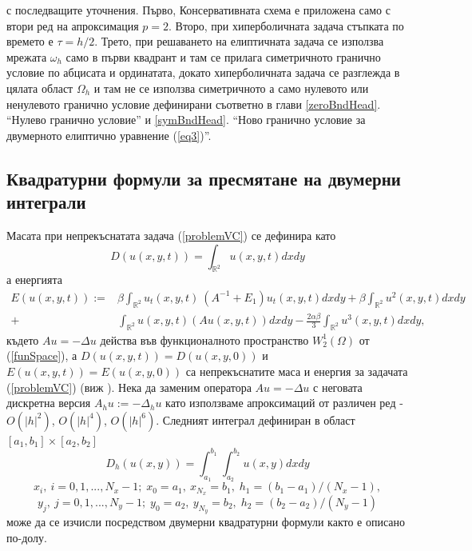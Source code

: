 \documentclass{article}
\newcommand{\rf}[1]{(\ref{#1})}
\newcommand{\RR}{\mathbb{R}}
\theoremstyle{remark}
\begin{document}
с последващите уточнения. Първо, Консервативната схема е приложена само с втори ред на апроксимация  $p=2$. Второ, при хиперболичната задача стъпката по времето е $\tau = h/2$. Трето, при решаването на елиптичната задача се използва мрежата $\omega_h$ само в първи квадрант и там се прилага симетричното гранично условие по абцисата и ординатата, докато хиперболичната задача се разглежда в цялата област $\Omega_h$ и там не се използва симетричното а само нулевото или ненулевото гранично условие дефинирани съответно в глави \ref{zeroBndHead}. ``Нулево гранично условие'' и \ref{symBndHead}. ``Ново гранично условие за двумерното елиптично уравнение \rf{eq3}''.

\subsection{Квадратурни формули за пресмятане на двумерни интеграли}\label{quadratureFormulas}

Масата при непрекъснатата задача \rf{problemVC} се дефинира като
\begin{equation}\label{intM}
D(u(x,y,t))=\int_{\RR^2} u(x,y,t)dx dy
\end{equation}
а енергията 
\begin{align}\label{ex-en}
E(u(x,y,t)):=&\beta \int_{\RR^2} u_t(x,y,t) \: \left(A^{-1}+E_1\right)u_t(x,y,t) dxdy+
\beta \int_{\RR^2} u^2(x,y,t) dxdy \nonumber\\
+& \int_{\RR^2}u(x,y,t) \left(A u(x,y,t)\right) dxdy
-\frac{2 \alpha \beta}{3} \int_{\RR^2} u^3(x,y,t) dxdy,
\end{align}
където $Au=-\Delta u$ действа във функционалното пространство $W^1_2(\Omega)$ от \rf{funSpace}, а $D(u(x,y,t)) = D(u(x,y,0))$ и $E(u(x,y,t)) = E(u(x,y,0))$ са непрекъснатите маса и енергия за задачата \rf{problemVC} (виж \cite{ref1}). Нека да заменим оператора $Au=-\Delta u$ с неговата дискретна версия $A_hu :=-\Delta_h u$ като използваме апроксимаций от различен ред - $O(|h|^2)$, $O(|h|^4)$, $O(|h|^6)$.
Следният интеграл дефиниран в област $[a_1, b_1] \times [a_2, b_2]$
\begin{equation}\label{int}
D_h(u(x,y))=\int_{a_1}^{b_1} \int_{a_2}^{b_2} u(x,y)dx dy
\end{equation}
$$x_i, ~i=0,1,...,N_x-1; \;x_0=a_1,~x_{N_x}=b_1, \;h_1=(b_1-a_1)/(N_x-1),$$
$$y_j, ~j=0,1,...,N_y-1; \; y_0=a_2,~y_{N_y}=b_2, \;h_2=(b_2-a_2)/(N_y-1)$$
може да се изчисли посредством двумерни квадратурни формули както е описано по-долу.
\end{document}
